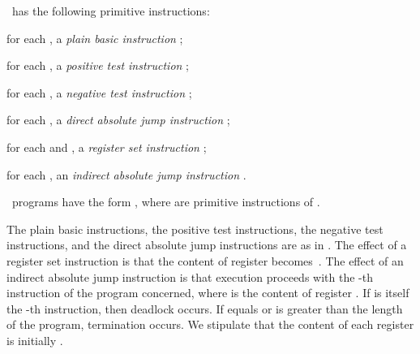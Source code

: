 \documentclass[fleqn]{llncs}
\begin{document}
\PGLDij\ has the following primitive instructions:
\begin{iteml}
\item
for each , a \emph{plain basic instruction} ;
\item
for each , a \emph{positive test instruction} ;
\item
for each , a \emph{negative test instruction} ;
\item
for each , a \emph{direct absolute jump instruction}
;
\item
for each  and ,
a \emph{register set instruction} ;
\item
for each , an \emph{indirect absolute jump instruction}
.
\end{iteml}
\PGLDij\ programs have the form , where
 are primitive instructions of \PGLDij.

The plain basic instructions, the positive test instructions, the
negative test instructions, and the direct absolute jump instructions
are as in \PGLD.
The effect of a register set instruction  is that the
content of register  becomes~.
The effect of an indirect absolute jump instruction  is that
execution proceeds with the -th instruction of the program concerned,
where  is the content of register .
If  is itself the -th instruction, then deadlock occurs.
If  equals  or  is greater than the length of the program,
termination occurs.
We stipulate that the content of each register is initially .
\end{document}

